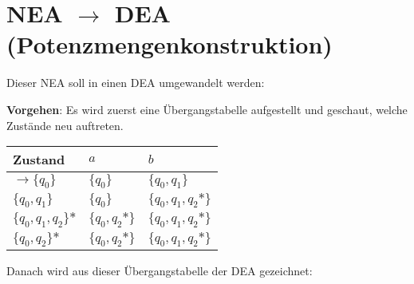 \section[NEA zu DEA mit Potenzmengenkonstruktion]{NEA $\to$ DEA (Potenzmengenkonstruktion)}
Dieser NEA soll in einen DEA umgewandelt werden:
\begin{figure}[H]
    \centering
    \begin{transitiongraph}[fa]
    \end{transitiongraph}
    \label{graph:NEA_LaTeX}
\end{figure}
\sloppy
\textbf{Vorgehen}: Es wird zuerst eine Übergangstabelle aufgestellt und geschaut, welche Zustände neu auftreten.
\fussy
\begin{table}[H]
\centering
\begin{tabular}{|l|l|l|}
\hline
Zustand             & $a$              & $b$                   \\
\hline
$\to \{q_0\}$           & $\{q_0\}$           & $\{q_0,q_1\}$       \\
\hline
$\{q_0,q_1\}$       & $\{q_0\}$           & $\{q_0,q_1,q_2\mbox{*}\}$ \\
\hline
$\{q_0,q_1,q_2\}\mbox{*}$ & $\{q_0,q_2\mbox{*}\}$ & $\{q_0,q_1,q_2\mbox{*}\}$   \\
\hline
$\{q_0,q_2\}\mbox{*}$      & $\{q_0,q_2\mbox{*}\}$ & $\{q_0,q_1,q_2\mbox{*}\}$ \\
\hline
\end{tabular}
\end{table}
Danach wird aus dieser Übergangstabelle der DEA gezeichnet:
\begin{figure}[H]
    \centering
    \begin{transitiongraph}[fa]
    \end{transitiongraph}
\end{figure}
